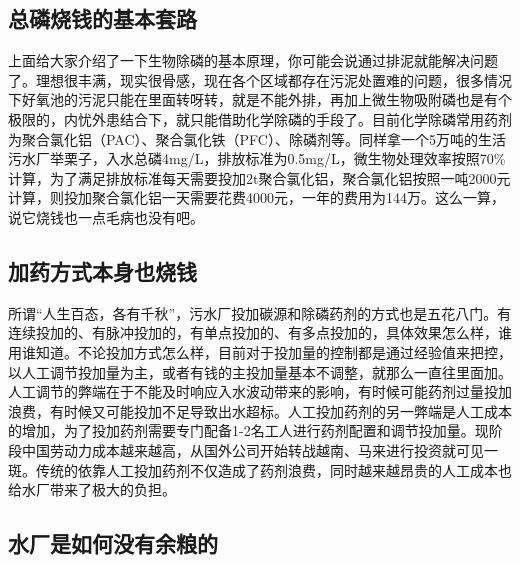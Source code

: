 \documentclass[]{book}
\begin{document}
\hypertarget{ux603bux78f7ux70e7ux94b1ux7684ux57faux672cux5957ux8def}{%
\subsection{总磷烧钱的基本套路}\label{ux603bux78f7ux70e7ux94b1ux7684ux57faux672cux5957ux8def}}

上面给大家介绍了一下生物除磷的基本原理，你可能会说通过排泥就能解决问题了。理想很丰满，现实很骨感，现在各个区域都存在污泥处置难的问题，很多情况下好氧池的污泥只能在里面转呀转，就是不能外排，再加上微生物吸附磷也是有个极限的，内忧外患结合下，就只能借助化学除磷的手段了。目前化学除磷常用药剂为聚合氯化铝（PAC）、聚合氯化铁（PFC）、除磷剂等。同样拿一个5万吨的生活污水厂举栗子，入水总磷4mg/L，排放标准为0.5mg/L，微生物处理效率按照70\%计算，为了满足排放标准每天需要投加2t聚合氯化铝，聚合氯化铝按照一吨2000元计算，则投加聚合氯化铝一天需要花费4000元，一年的费用为144万。这么一算，说它烧钱也一点毛病也没有吧。

\hypertarget{ux52a0ux836fux65b9ux5f0fux672cux8eabux4e5fux70e7ux94b1}{%
\subsection{加药方式本身也烧钱}\label{ux52a0ux836fux65b9ux5f0fux672cux8eabux4e5fux70e7ux94b1}}

所谓``人生百态，各有千秋''，污水厂投加碳源和除磷药剂的方式也是五花八门。有连续投加的、有脉冲投加的，有单点投加的、有多点投加的，具体效果怎么样，谁用谁知道。不论投加方式怎么样，目前对于投加量的控制都是通过经验值来把控，以人工调节投加量为主，或者有钱的主投加量基本不调整，就那么一直往里面加。人工调节的弊端在于不能及时响应入水波动带来的影响，有时候可能药剂过量投加浪费，有时候又可能投加不足导致出水超标。人工投加药剂的另一弊端是人工成本的增加，为了投加药剂需要专门配备1-2名工人进行药剂配置和调节投加量。现阶段中国劳动力成本越来越高，从国外公司开始转战越南、马来进行投资就可见一斑。传统的依靠人工投加药剂不仅造成了药剂浪费，同时越来越昂贵的人工成本也给水厂带来了极大的负担。

\hypertarget{ux6c34ux5382ux662fux5982ux4f55ux6ca1ux6709ux4f59ux7caeux7684}{%
\subsection{水厂是如何没有余粮的}\label{ux6c34ux5382ux662fux5982ux4f55ux6ca1ux6709ux4f59ux7caeux7684}}
\end{document}
